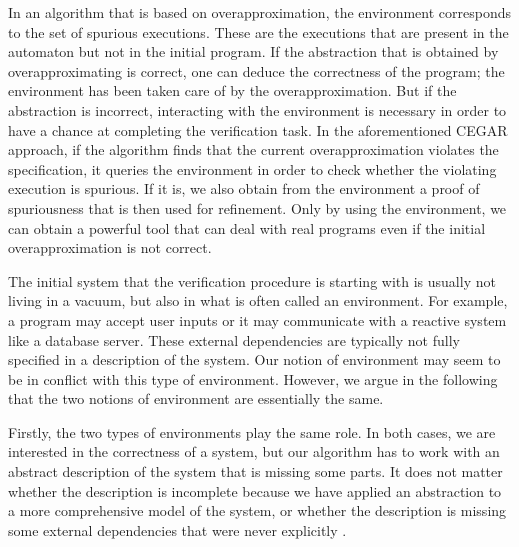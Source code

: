 \documentclass[../../diss.tex]{subfiles}
\begin{document}
In an algorithm that is based on overapproximation, the environment corresponds to the set of spurious executions.
These are the executions that are present in the automaton but not in the initial program.
If the abstraction that is obtained by overapproximating is correct, one can deduce the correctness of the program; the environment has been taken care of by the overapproximation.
But if the abstraction is incorrect, interacting with the environment is necessary in order to have a chance at completing the verification task.
In the aforementioned CEGAR approach, if the algorithm finds that the current overapproximation violates the specification, it queries the environment in order to check whether the violating execution is spurious.
If it is, we also obtain from the environment a proof of spuriousness that is then used for refinement.
Only by using the environment, we can obtain a powerful tool that can deal with real programs even if the initial overapproximation is not correct.

The initial system that the verification procedure is starting with is usually not living in a vacuum, but also in what is often called an environment.
For example, a program may accept user inputs or it may communicate with a reactive system like a database server.
These external dependencies are typically not fully specified in a description of the system.
Our notion of environment may seem to be in conflict with this type of environment.
However, we argue in the following that the two notions of environment are essentially the same.

Firstly, the two types of environments play the same role.
In both cases, we are interested in the correctness of a system, but our algorithm has to work with an abstract description of the system that is missing some parts.
It does not matter whether the description is incomplete because we have applied an abstraction to a more comprehensive model of the system, or whether the description is missing some external dependencies that were never explicitly .
\end{document}
